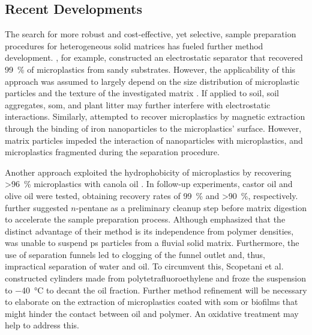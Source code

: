 \subsection{Recent Developments}
\label{sec:analytical-techniques:recent-developments}

The search for more robust and cost-effective, yet selective, sample preparation procedures for heterogeneous solid matrices has fueled further method development. , for example,
constructed an electrostatic separator that recovered \SI{99}{\percent} of microplastics from sandy substrates. However, the applicability of this approach was assumed to largely depend on the size distribution of microplastic particles and the texture of the investigated matrix \citep{EndersEvaluation2020}. If applied to soil, soil aggregates, \ac{som},
and plant litter may further interfere with electrostatic interactions.
Similarly, \citet{GrbicMagnetic2019} attempted to recover microplastics by magnetic extraction through the binding of iron nanoparticles to the microplastics' surface. However, matrix particles impeded the interaction of nanoparticles with microplastics, and microplastics fragmented during the separation procedure.

Another approach exploited the hydrophobicity of microplastics by recovering \SI{>96}{\percent} microplastics with canola oil \citep{CrichtonNovel2017}. In follow-up experiments, castor oil \citep{ManiUsing2019} and olive oil \citep{ScopetaniOlive2020} were tested,
obtaining recovery rates of \SI{99}{\percent} and \SI{>90}{\percent},
respectively.  further suggested $n$-pentane as a preliminary cleanup step before matrix digestion to accelerate the sample preparation process. Although \citet{ScopetaniOlive2020} emphasized that the distinct advantage of their method is its independence from polymer densities, \citet{ManiUsing2019} was unable to suspend \ac{ps} particles from a fluvial solid matrix. Furthermore, the use of separation funnels led to clogging of the funnel outlet and, thus, impractical separation of water and oil. To circumvent this, Scopetani et al.  constructed cylinders made from polytetrafluoroethylene and froze the suspension to \SI{-40}{\degreeCelsius} to decant the oil fraction. Further method refinement will be necessary to elaborate on the extraction of microplastics coated with \ac{som} or biofilms that might hinder the contact between oil and polymer. An oxidative treatment may help to address this.

